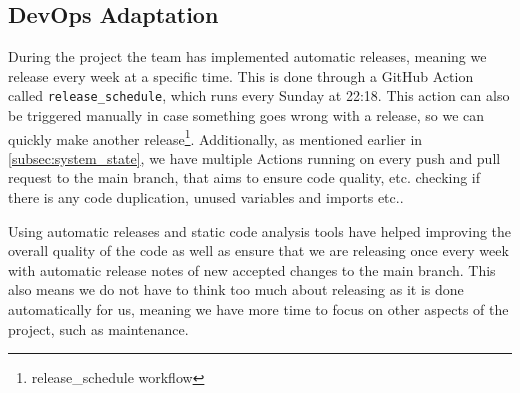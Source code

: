 \subsection{DevOps Adaptation}
During the project the team has implemented automatic releases, meaning we release every week at a specific time. This is done through a GitHub Action called \texttt{release\_schedule}, which runs every Sunday at 22:18.
This action can also be triggered manually in case something goes wrong with a release, so we can quickly make another release\footnote{release\_schedule workflow\cite{gitRelease}}.
Additionally, as mentioned earlier in \ref{subsec:system_state}, we have multiple Actions running on every push and pull request to the main branch, that aims to ensure code quality, etc. checking if there is any code duplication, unused variables and imports etc..

Using automatic releases and static code analysis tools have helped improving the overall quality of the code as well as ensure that we are releasing once every week with automatic release notes of new accepted changes to the main branch. This also means we do not have to think too much about releasing as it is done automatically for us, meaning we have more time to focus on other aspects of the project, such as maintenance.